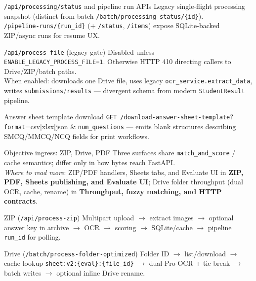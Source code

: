 \documentclass[aspectratio=169]{beamer}
\begin{document}
\begin{frame}{\texttt{/api/processing/status} and pipeline run APIs}
  \small
  Legacy single-flight processing snapshot (distinct from batch \texttt{/batch/processing-status/\{id\}}).\\
  \texttt{/pipeline-runs/\{run\_id\}} (+ \texttt{/status}, \texttt{/items}) expose SQLite-backed ZIP/async runs for resume UX.
\end{frame}

\begin{frame}{\texttt{/api/process-file} (legacy gate)}
  \small
  Disabled unless \texttt{ENABLE\_LEGACY\_PROCESS\_FILE=1}. Otherwise HTTP 410 directing callers to Drive/ZIP/batch paths.\\
  When enabled: downloads one Drive file, uses legacy \texttt{ocr\_service.extract\_data}, writes \texttt{submissions}/\texttt{results} --- divergent schema from modern \texttt{StudentResult} pipeline.
\end{frame}

\begin{frame}{Answer sheet template download}
  \small
  \texttt{GET /download-answer-sheet-template}? \texttt{format}=csv|xlsx|json \& \texttt{num\_questions} --- emits blank structures describing SMCQ/MMCQ/NCQ fields for print workflows.
\end{frame}

\begin{frame}{Objective ingress: ZIP, Drive, PDF}
  \footnotesize
  Three surfaces share \texttt{match\_and\_score} / cache semantics; differ only in how bytes reach FastAPI.\\
  \textit{Where to read more}: ZIP/PDF handlers, Sheets tabs, and Evaluate UI in \textbf{ZIP, PDF, Sheets publishing, and Evaluate UI}; Drive folder throughput (dual OCR, cache, rename) in \textbf{Throughput, fuzzy matching, and HTTP contracts}.
\end{frame}

\begin{frame}{ZIP (\texttt{/api/process-zip})}
  \footnotesize
  Multipart upload $\rightarrow$ extract images $\rightarrow$ optional answer key in archive $\rightarrow$ OCR $\rightarrow$ scoring $\rightarrow$ SQLite/cache $\rightarrow$ pipeline \texttt{run\_id} for polling.
\end{frame}

\begin{frame}{Drive (\texttt{/batch/process-folder-optimized})}
  \footnotesize
  Folder ID $\rightarrow$ list/download $\rightarrow$ cache lookup \texttt{sheet:v2:\{eval\}:\{file\_id\}} $\rightarrow$ dual Pro OCR + tie-break $\rightarrow$ batch writes $\rightarrow$ optional inline Drive rename.
\end{frame}
\end{document}
